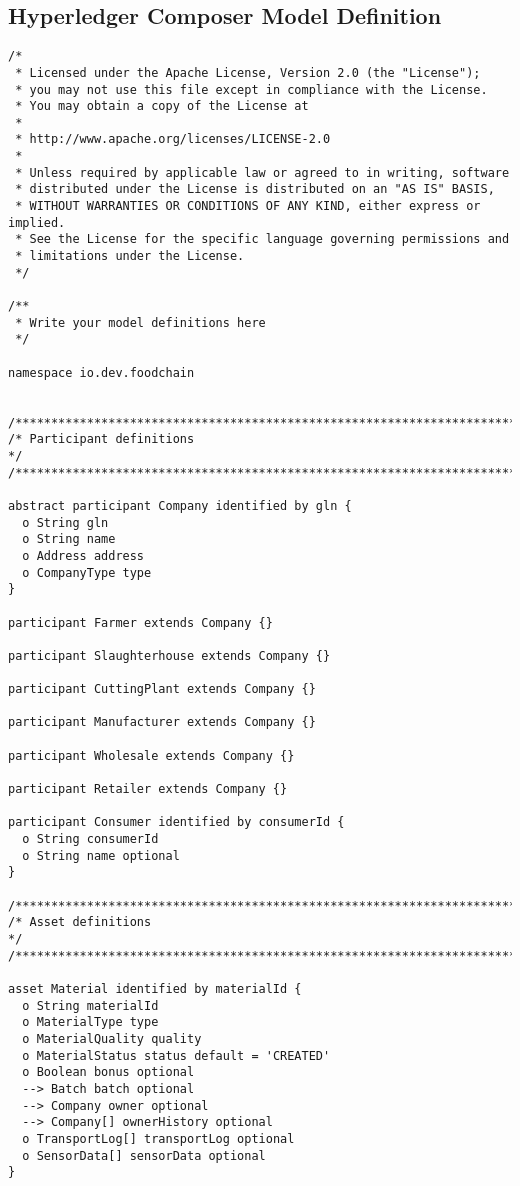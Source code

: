 \subsection{Hyperledger Composer Model Definition} \label{lst:hlc-model-definition}
\begin{lstlisting}[]
/*
 * Licensed under the Apache License, Version 2.0 (the "License");
 * you may not use this file except in compliance with the License.
 * You may obtain a copy of the License at
 *
 * http://www.apache.org/licenses/LICENSE-2.0
 *
 * Unless required by applicable law or agreed to in writing, software
 * distributed under the License is distributed on an "AS IS" BASIS,
 * WITHOUT WARRANTIES OR CONDITIONS OF ANY KIND, either express or implied.
 * See the License for the specific language governing permissions and
 * limitations under the License.
 */

/**
 * Write your model definitions here
 */

namespace io.dev.foodchain


/*****************************************************************************/
/* Participant definitions                                                   */
/*****************************************************************************/

abstract participant Company identified by gln {
  o String gln
  o String name
  o Address address
  o CompanyType type
}

participant Farmer extends Company {}

participant Slaughterhouse extends Company {}

participant CuttingPlant extends Company {}

participant Manufacturer extends Company {}

participant Wholesale extends Company {}

participant Retailer extends Company {}

participant Consumer identified by consumerId {
  o String consumerId
  o String name optional
}

/*****************************************************************************/
/* Asset definitions                                                         */
/*****************************************************************************/

asset Material identified by materialId {
  o String materialId
  o MaterialType type
  o MaterialQuality quality
  o MaterialStatus status default = 'CREATED'
  o Boolean bonus optional
  --> Batch batch optional
  --> Company owner optional
  --> Company[] ownerHistory optional
  o TransportLog[] transportLog optional
  o SensorData[] sensorData optional
}


\end{lstlisting}
